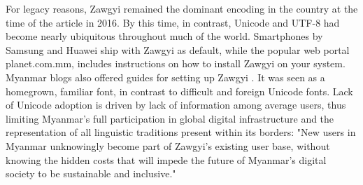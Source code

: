 For legacy reasons, Zawgyi remained the dominant encoding in the country at the
time of the article in 2016. By this time, in contrast, Unicode and UTF-8 had
become nearly ubiquitous throughout much of the world. Smartphones by Samsung
and Huawei ship with Zawgyi as default, while the popular web portal
planet.com.mm, includes instructions on how to install Zawgyi on your system.
Myanmar blogs also offered guides for setting up Zawgyi \parencite{hotchkiss16}.
It was seen as a homegrown, familiar font, in contrast to difficult and foreign
Unicode fonts.  Lack of Unicode adoption is driven by lack of information among
average users, thus limiting Myanmar's full participation in global digital
infrastructure and the representation of all linguistic traditions present
within its borders: "New users in Myanmar unknowingly become part of Zawgyi’s
existing user base, without knowing the hidden costs that will impede the future
of Myanmar’s digital society to be sustainable and inclusive."
\parencite{liao17}
